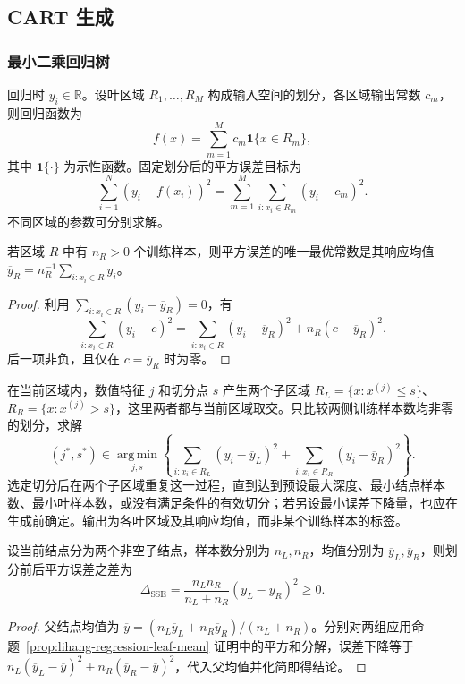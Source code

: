 \subsection{CART 生成}

\subsubsection{最小二乘回归树}

回归时 $y_i\in\mathbb R$。设叶区域 $R_1,\ldots,R_M$ 构成输入空间的划分，各区域输出常数 $c_m$，则回归函数为
\begin{equation}
  f(x)=\sum_{m=1}^Mc_m\mathbf1\{x\in R_m\},
  \label{eq:lihang-regression-tree}
\end{equation}
其中 $\mathbf1\{\cdot\}$ 为示性函数。固定划分后的平方误差目标为
\[
  \sum_{i=1}^N(y_i-f(x_i))^2
  =\sum_{m=1}^M\sum_{i:x_i\in R_m}(y_i-c_m)^2.
\]
不同区域的参数可分别求解。

\begin{proposition}[回归叶的最优常数]
\label{prop:lihang-regression-leaf-mean}
若区域 $R$ 中有 $n_R>0$ 个训练样本，则平方误差的唯一最优常数是其响应均值 $\overline y_R=n_R^{-1}\sum_{i:x_i\in R}y_i$。
\end{proposition}
\begin{proof}
利用 $\sum_{i:x_i\in R}(y_i-\overline y_R)=0$，有
\[
  \sum_{i:x_i\in R}(y_i-c)^2
  =\sum_{i:x_i\in R}(y_i-\overline y_R)^2+n_R(c-\overline y_R)^2.
\]
后一项非负，且仅在 $c=\overline y_R$ 时为零。\qedhere
\end{proof}

在当前区域内，数值特征 $j$ 和切分点 $s$ 产生两个子区域 $R_L=\{x:x^{(j)}\leq s\}$、$R_R=\{x:x^{(j)}>s\}$，这里两者都与当前区域取交。只比较两侧训练样本数均非零的划分，求解
\begin{equation}
  (j^*,s^*)\in\operatorname*{arg\,min}_{j,s}
  \left\{\sum_{i:x_i\in R_L}(y_i-\overline y_L)^2
  +\sum_{i:x_i\in R_R}(y_i-\overline y_R)^2\right\}.
  \label{eq:lihang-cart-regression-split}
\end{equation}
选定切分后在两个子区域重复这一过程，直到达到预设最大深度、最小结点样本数、最小叶样本数，或没有满足条件的有效切分；若另设最小误差下降量，也应在生成前确定。输出为各叶区域及其响应均值，而非某个训练样本的标签。

\begin{proposition}[平方误差的划分收益]
设当前结点分为两个非空子结点，样本数分别为 $n_L,n_R$，均值分别为 $\overline y_L,\overline y_R$，则划分前后平方误差之差为
\begin{equation}
  \Delta_{\mathrm{SSE}}=
  \frac{n_Ln_R}{n_L+n_R}(\overline y_L-\overline y_R)^2\geq0.
  \label{eq:lihang-cart-sse-gain}
\end{equation}
\end{proposition}
\begin{proof}
父结点均值为 $\overline y=(n_L\overline y_L+n_R\overline y_R)/(n_L+n_R)$。分别对两组应用命题~\ref{prop:lihang-regression-leaf-mean} 证明中的平方和分解，误差下降等于 $n_L(\overline y_L-\overline y)^2+n_R(\overline y_R-\overline y)^2$，代入父均值并化简即得结论。\qedhere
\end{proof}

